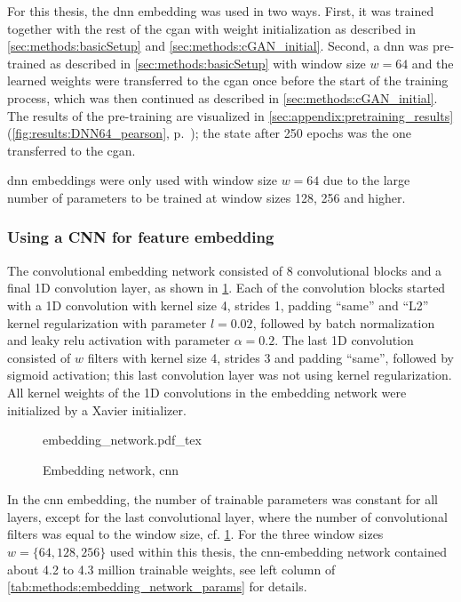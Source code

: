 For this thesis, the \acrshort{dnn} embedding was used in two ways.
First, it was trained together with the rest of the \acrshort{cgan} with weight initialization as described in 
\cref{sec:methods:basicSetup} and \ref{sec:methods:cGAN_initial}.
Second, a \acrshort{dnn} was pre-trained as described in \cref{sec:methods:basicSetup} with window size $w=64$
and the learned weights were transferred to the \acrshort{cgan} once before the start of the training process,
which was then continued as described in \cref{sec:methods:cGAN_initial}.
The results of the pre-training are visualized in \cref{sec:appendix:pretraining_results} (\cref{fig:results:DNN64_pearson}, p.~\pageref{fig:results:DNN64_pearson});
the state after 250 epochs was the one transferred to the \acrshort{cgan}.

\acrshort{dnn} embeddings were only used with window size $w=64$ due to the large number of parameters
to be trained at window sizes 128, 256 and higher.

\subsubsection{Using a CNN for feature embedding} \label{sec:methods:cnn-embedding}
The convolutional embedding network consisted of 8 convolutional blocks and a final 1D convolution layer, 
as shown in \cref{fig:methods:GAN_arch:embedding_network}.
Each of the convolution blocks started with a 1D convolution with kernel size 4, strides 1, padding ``same'' 
and ``L2'' kernel regularization with parameter $l=0.02$, followed by batch normalization and leaky \acrshort{relu} activation
with parameter $\alpha=0.2$. 
The last 1D convolution consisted of $w$ filters with kernel size 4, strides 3 and padding ``same'',
followed by sigmoid activation; this last convolution layer was not using kernel regularization.
All kernel weights of the 1D convolutions in the embedding network were initialized by a Xavier initializer.
\begin{figure}[p]
    \scriptsize
    \centering
    {embedding_network.pdf_tex}
    \caption{Embedding network, \acrshort{cnn}} \label{fig:methods:GAN_arch:embedding_network}
\end{figure}

In the \acrshort{cnn} embedding, the number of trainable parameters was constant for all layers, except for the last convolutional layer, where the number
of convolutional filters was equal to the window size, cf. \cref{fig:methods:GAN_arch:embedding_network}. 
For the three window sizes $w=\{64,128,256\}$ used within this thesis, the \acrshort{cnn}-embedding network 
contained about 4.2 to 4.3 million trainable weights, see left column of \cref{tab:methods:embedding_network_params} for details.

